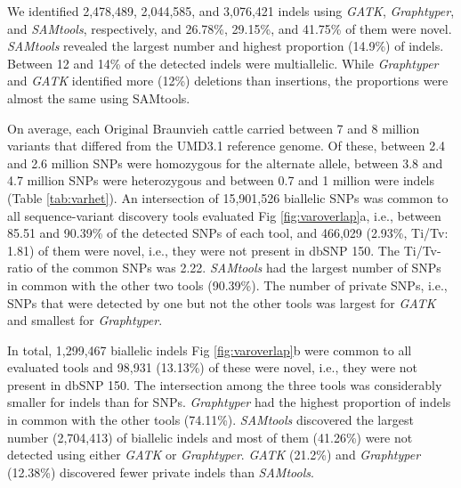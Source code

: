 \documentclass[../main.tex]{subfiles}
\begin{document}
\newpage

We identified 2,478,489, 2,044,585, and 3,076,421 indels using \emph{GATK}, \emph{Graphtyper}, and \emph{SAMtools}, respectively, and 26.78\%, 29.15\%, and 41.75\% of them were novel. 
\emph{SAMtools} revealed the largest number and highest proportion (14.9\%) of indels. 
Between 12 and 14\% of the detected indels were multiallelic. 
While \emph{Graphtyper} and \emph{GATK} identified more (12\%) deletions than insertions, the proportions were almost the same using SAMtools.

On average, each Original Braunvieh cattle carried between 7 and 8 million variants that differed from the UMD3.1 reference genome. 
Of these, between 2.4 and 2.6 million SNPs were homozygous for the alternate allele, between 3.8 and 4.7 million SNPs were heterozygous and between 0.7 and 1 million were indels (Table \ref{tab:varhet}). An intersection of 15,901,526 biallelic SNPs was common to all sequence-variant discovery tools evaluated Fig \ref{fig:varoverlap}a, i.e., between 85.51 and 90.39\% of the detected SNPs of each tool, and 466,029 (2.93\%, Ti/Tv: 1.81) of them were novel, i.e., they were not present in dbSNP 150. 
The Ti/Tv-ratio of the common SNPs was 2.22. 
\emph{SAMtools} had the largest number of SNPs in common with the other two tools (90.39\%). The number of private SNPs, i.e., SNPs that were detected by one but not the other tools was largest for \emph{GATK} and smallest for \emph{Graphtyper}.

In total, 1,299,467 biallelic indels Fig \ref{fig:varoverlap}b were common to all evaluated tools and 98,931 (13.13\%) of these were novel, 
i.e., they were not present in dbSNP 150. The intersection among the three tools was considerably smaller for indels than for SNPs. 
\emph{Graphtyper} had the highest proportion of indels in common with the other tools (74.11\%). 
\emph{SAMtools} discovered the largest number (2,704,413) of biallelic indels and most of them (41.26\%) were not detected using either \emph{GATK} or \emph{Graphtyper}. 
\emph{GATK} (21.2\%) and \emph{Graphtyper} (12.38\%) discovered fewer private indels than \emph{SAMtools}.

\newpage
\end{document}

